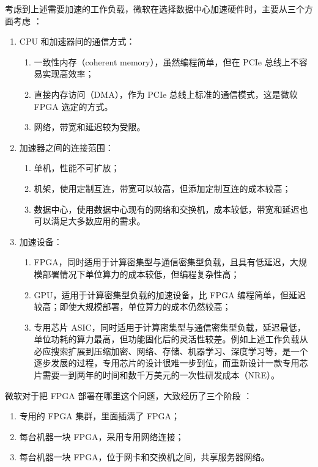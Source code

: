 考虑到上述需要加速的工作负载，微软在选择数据中心加速硬件时，主要从三个方面考虑 \cite{putnam2014reconfigurable}：

\begin{enumerate}
	\item CPU 和加速器间的通信方式：
	\begin{enumerate}
		\item 一致性内存（coherent memory），虽然编程简单，但在 PCIe 总线上不容易实现高效率；
		\item 直接内存访问（DMA），作为 PCIe 总线上标准的通信模式，这是微软 FPGA 选定的方式。
		\item 网络，带宽和延迟较为受限。
	\end{enumerate}
	\item 加速器之间的连接范围：
	\begin{enumerate}
		\item 单机，性能不可扩放；
		\item 机架，使用定制互连，带宽可以较高，但添加定制互连的成本较高；
		\item 数据中心，使用数据中心现有的网络和交换机，成本较低，带宽和延迟也可以满足大多数应用的需求。
	\end{enumerate}
	\item 加速设备：
	\begin{enumerate}
		\item FPGA，同时适用于计算密集型与通信密集型负载，且具有低延迟，大规模部署情况下单位算力的成本较低，但编程复杂性高；
		\item GPU，适用于计算密集型负载的加速设备，比 FPGA 编程简单，但延迟较高；即使大规模部署，单位算力的成本仍然较高；
		\item 专用芯片 ASIC，同时适用于计算密集型与通信密集型负载，延迟最低，单位功耗的算力最高，但功能固化后的灵活性较差。例如上述工作负载从必应搜索扩展到压缩加密、网络、存储、机器学习、深度学习等，是一个逐步发展的过程，专用芯片的设计很难一步到位，而重新设计一款专用芯片需要一到两年的时间和数千万美元的一次性研发成本（NRE）。
	\end{enumerate}
\end{enumerate}





微软对于把 FPGA 部署在哪里这个问题，大致经历了三个阶段 \cite{configurable-cloud-acceleration}：
\begin{enumerate}
	\item 专用的 FPGA 集群，里面插满了 FPGA；
	\item 每台机器一块 FPGA，采用专用网络连接；
	\item 每台机器一块 FPGA，位于网卡和交换机之间，共享服务器网络。
\end{enumerate}

